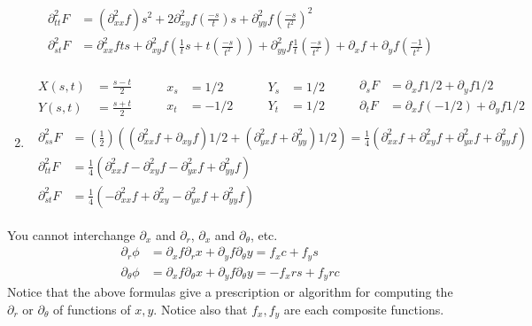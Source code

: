 \documentclass[twoside]{amsart}
\theoremstyle{plain}
\theoremstyle{definition}
\newcommand{\exercisehead}[1]
  {
   \noindent{\small\bf Exercise #1.}
   \smallskip}
\begin{document}
\begin{enumerate}
\[\begin{gathered}
\begin{aligned}
  \partial_{tt}^2 F & = (\partial_{xx}^2 f)s^2 + 2 \partial_{xy}^2 f \left( \frac{-s}{t} \right) s + \partial_{yy}^2 f \left( \frac{-s}{t^2} \right)^2 \\
  \partial_{st}^2 F & = \partial_{xx}^2 f ts + \partial_{xy}^2 f \left( \frac{1}{t} s + t \left( \frac{-s}{t^2} \right) \right) + \partial_{yy}^2 f \frac{1}{t} \left( \frac{-s}{t^2 } \right) + \partial_x f + \partial_y f \left( \frac{-1}{t^2} \right) 
\end{aligned}
\end{gathered}
\]
  \item \[
\begin{gathered}
  \begin{aligned}
    X(s,t) & = \frac{s-t}{2} \\
    Y(s,t) & = \frac{s+t}{2} 
\end{aligned} \quad \quad \begin{aligned} x_s & = 1/2 \\ x_t & = -1/2 \end{aligned} \quad \quad \begin{aligned} Y_s & = 1/2 \\ Y_t & = 1/2 \end{aligned} \quad \quad \begin{aligned} \partial_s F & = \partial_x f 1/2 + \partial_y f 1/2 \\ \partial_t F & = \partial_x f (-1/2) + \partial_y f 1/2 \end{aligned} \\ 
  \begin{aligned}
    \partial_{ss}^2 F & = \left(\frac{1}{2} \right) ((\partial_{xx}^2 f + \partial_{xy} f )1/2 + (\partial_{yx}^2 f + \partial_{yy}^2 ) 1/2) = \frac{1}{4} (\partial_{xx}^2 f + \partial_{xy}^2 f + \partial_{yx}^2 f + \partial_{yy}^2 f ) \\
    \partial_{tt}^2 F & = \frac{1}{4} (\partial_{xx}^2 f - \partial_{xy}^2 f - \partial_{yx}^2 f + \partial_{yy}^2 f ) \\
    \partial_{st}^2 F  & = \frac{1}{4} ( -\partial_{xx}^2 f + \partial_{xy}^2 - \partial_{yx}^2 f + \partial_{yy}^2 f )
  \end{aligned}
\end{gathered}
\]
\end{enumerate}

\exercisehead{5} {\large You cannot interchange $\partial_x$ and $\partial_r$, $\partial_x$ and $\partial_{\theta}$, etc.}
\[
\begin{aligned}
  \partial_r \phi & = \partial_x f \partial_r x + \partial_y f \partial_{\theta} y = f_x c + f_y s \\
  \partial_{\theta} \phi & = \partial_x f \partial_{\theta} x + \partial_y f \partial_{\theta} y = -f_x rs + f_y rc
\end{aligned}
\]
Notice that the above formulas give a prescription or algorithm for computing the $\partial_r$ or $\partial_{\theta}$ of functions of $x,y$.  Notice also that $f_x, f_y$ are each composite functions.  
\end{document}

